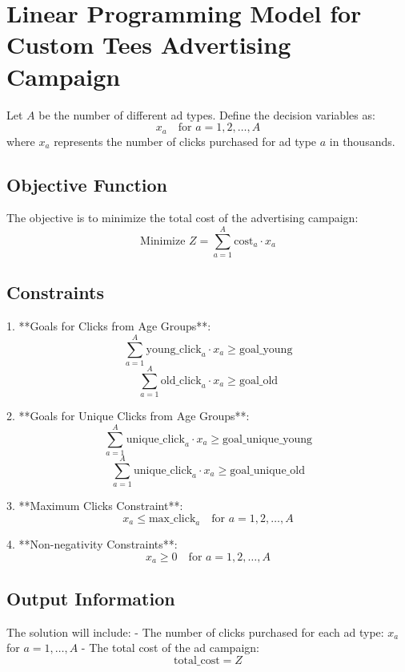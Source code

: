 \documentclass{article}
\begin{document}
\section*{Linear Programming Model for Custom Tees Advertising Campaign}

Let \( A \) be the number of different ad types. Define the decision variables as:
\[
x_a \quad \text{for } a = 1, 2, \ldots, A
\]
where \( x_a \) represents the number of clicks purchased for ad type \( a \) in thousands.

\subsection*{Objective Function}
The objective is to minimize the total cost of the advertising campaign:
\[
\text{Minimize } Z = \sum_{a=1}^{A} \text{cost}_a \cdot x_a
\]

\subsection*{Constraints}

1. **Goals for Clicks from Age Groups**:
   \[
   \sum_{a=1}^{A} \text{young\_click}_{a} \cdot x_a \geq \text{goal\_young}
   \]
   \[
   \sum_{a=1}^{A} \text{old\_click}_{a} \cdot x_a \geq \text{goal\_old}
   \]

2. **Goals for Unique Clicks from Age Groups**:
   \[
   \sum_{a=1}^{A} \text{unique\_click}_{a} \cdot x_a \geq \text{goal\_unique\_young}
   \]
   \[
   \sum_{a=1}^{A} \text{unique\_click}_{a} \cdot x_a \geq \text{goal\_unique\_old}
   \]

3. **Maximum Clicks Constraint**:
   \[
   x_a \leq \text{max\_click}_{a} \quad \text{for } a = 1, 2, \ldots, A
   \]

4. **Non-negativity Constraints**:
   \[
   x_a \geq 0 \quad \text{for } a = 1, 2, \ldots, A
   \]

\subsection*{Output Information}
The solution will include:
- The number of clicks purchased for each ad type: \( x_a \) for \( a = 1, \ldots, A \)
- The total cost of the ad campaign: 
\[
\text{total\_cost} = Z
\]
\end{document}
